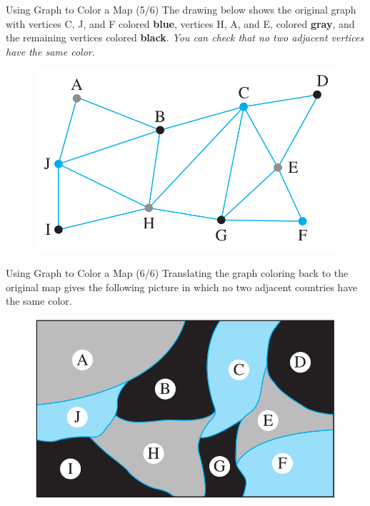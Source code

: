 \documentclass[english,t]{beamer}
\begin{document}
\begin{frame}{Using Graph to Color a Map (5/6)}
	The drawing below shows the original graph with vertices C, J, and F colored \textbf{blue}, vertices H, A, and E, colored \textbf{gray}, and the
	remaining vertices colored \textbf{black}. \textit{You can check that no two adjacent vertices have the same color}.
	\begin{figure}[!ht]
		\centering
		\includegraphics[scale=.25]{images/map-coloring-5}
	\end{figure}	
\end{frame}

\begin{frame}{Using Graph to Color a Map (6/6)}
	Translating the graph coloring back to the original map gives the following picture in which no two adjacent countries have the same color.
	\begin{figure}[!ht]
		\centering
		\includegraphics[scale=.25]{images/map-coloring-6}
	\end{figure}	
\end{frame}
\end{document}

